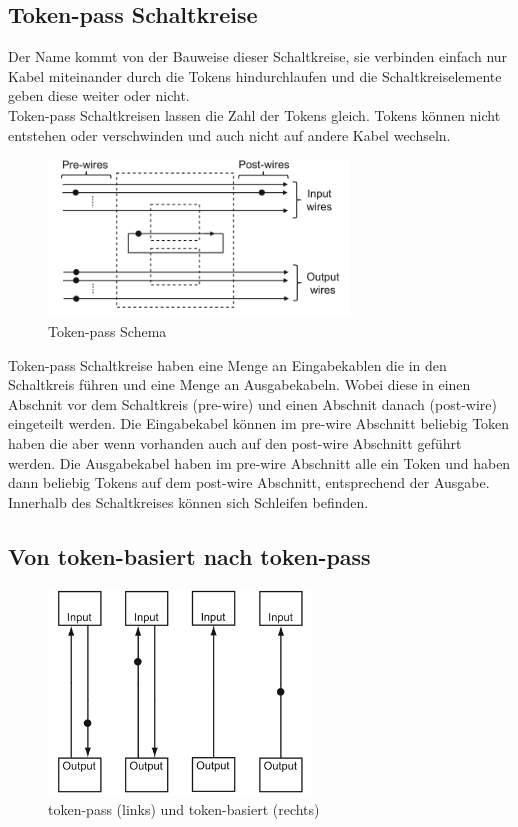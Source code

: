 \documentclass[11pt,a4paper]{article}
\begin{document}

\subsection{Token-pass Schaltkreise}
Der Name kommt von der Bauweise dieser Schaltkreise, sie verbinden einfach nur
Kabel miteinander durch die Tokens hindurchlaufen und die Schaltkreiselemente
geben diese weiter oder nicht. \\
%
Token-pass Schaltkreisen lassen die Zahl der Tokens gleich.
%
Tokens können nicht entstehen oder verschwinden und auch 
nicht auf andere Kabel wechseln.

\begin{figure}[h]
    \centering
    \includegraphics[width=8cm]{bilder/TokenPassScheme.png}
    \caption{Token-pass Schema}
    \label{fig:tokenPassScheme}
\end{figure} 


Token-pass Schaltkreise haben eine Menge an Eingabekablen die in
den Schaltkreis führen und eine Menge an Ausgabekabeln.
%
Wobei diese in einen Abschnit vor dem Schaltkreis (pre-wire) und einen Abschnit
danach (post-wire) eingeteilt werden.
%
Die Eingabekabel können im pre-wire Abschnitt beliebig Token haben die aber 
wenn vorhanden auch auf den post-wire Abschnitt geführt werden.
%
Die Ausgabekabel haben im pre-wire Abschnitt alle ein Token und haben dann
beliebig Tokens auf dem post-wire Abschnitt, entsprechend der Ausgabe.
%
Innerhalb des Schaltkreises können sich Schleifen befinden. 
%

\subsection{Von token-basiert nach token-pass}

\begin{figure}[h]
    \centering
    \includegraphics[width=7cm]{bilder/basedToPass.png}
    \caption{token-pass (links) und token-basiert (rechts)}
\end{figure}
\end{document}
